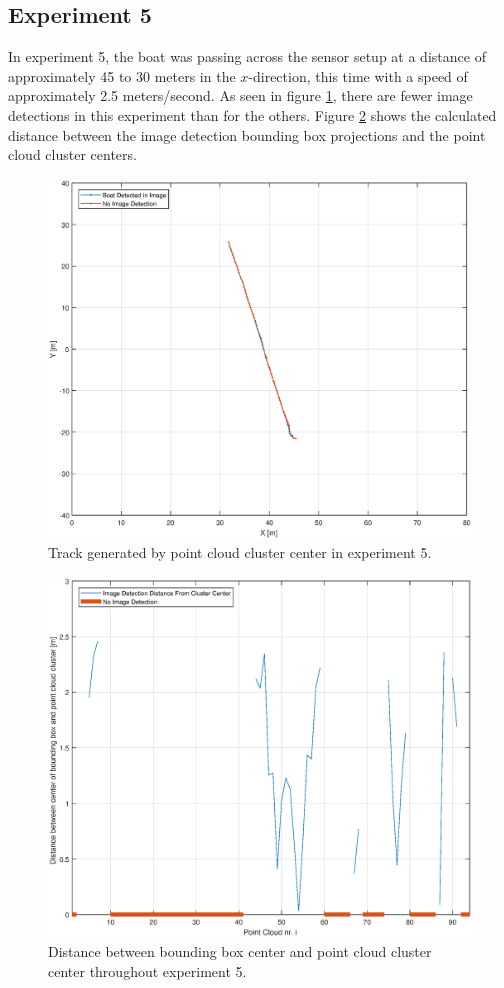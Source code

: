 \subsection{Experiment 5}
In experiment 5, the boat was passing across the sensor setup at a distance of approximately 45 to 30 meters in the $x$-direction, this time with a speed of approximately 2.5 meters/second. As seen in figure \ref{fig:ex5_track}, there are fewer image detections in this experiment than for the others. Figure \ref{fig:ex5_pc_dist} shows the calculated distance between the image detection bounding box projections and the point cloud cluster centers.
\begin{figure}[H]
	\centering
	\includegraphics[width=.8\linewidth]{fig/exp_5_track.eps}
	\caption{Track generated by point cloud cluster center in experiment 5.}
	\label{fig:ex5_track}
\end{figure}
\begin{figure}[H]
	\centering
	\includegraphics[width=.8\linewidth]{fig/exp_5_dist_pr_pc.eps}
	\caption{Distance between bounding box center and point cloud cluster center throughout experiment 5.}
	\label{fig:ex5_pc_dist}
\end{figure}
